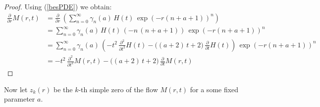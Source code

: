 \documentclass[a4paper,11pt,twoside]{amsart}
\begin{document}
\begin{proof}
Using (\ref{besPDE}) we obtain:
\begin{align}
 \frac{\partial}{\partial r}M(r,t) &=  \frac{\partial}{\partial r}\,\left(\sum_{n=0}^\infty \gamma_n(a)\,H(t)\,\exp(-r(n+a+1))^{n}\right) \\
 &= \sum_{n=0}^\infty \gamma_n(a)\,H(t)\,\left(-n\,(n+a+1)\right)\,\exp(-r(n+a+1))^{n} \\
 &= \sum_{n=0}^\infty \gamma_n(a)\,\left(-t^2\,\frac{\partial^2}{\partial t^2}H(t)- \big((a+2)\,t+2\big)\, \frac{\partial}{\partial t}H(t)  \right)\, \exp(-r(n+a+1))^{n}\\
 &=-t^2\,\frac{\partial^2}{\partial t^2}M(r,t) - \big((a+2)\,t+2\big)\,\frac{\partial }{\partial t}M(r,t)
\end{align}
\end{proof}

Now let $z_k(r)$ be the $k$-th simple zero of the flow $M(r,t)$ for a some fixed parameter $a$.
 
\end{document}
